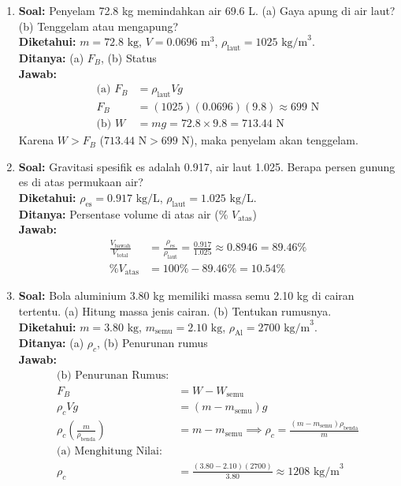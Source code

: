 \documentclass[twocolumn]{article}
\begin{document}
\begin{enumerate}
    \item \textbf{Soal:} Penyelam 72.8 kg memindahkan air 69.6 L. (a) Gaya apung di air laut? (b) Tenggelam atau mengapung? \\
    \textbf{Diketahui:} $m = 72.8 \text{ kg}$, $V = 0.0696 \text{ m}^3$, $\rho_{\text{laut}} = 1025 \text{ kg/m}^3$. \\
    \textbf{Ditanya:} (a) $F_B$, (b) Status \\
    \textbf{Jawab:}
    \begin{align*}
        \text{(a) } F_B &= \rho_{\text{laut}} V g \\
        F_B &= (1025)(0.0696)(9.8) \approx 699 \text{ N} \\
        \text{(b) } W &= mg = 72.8 \times 9.8 = 713.44 \text{ N}
    \end{align*}
    Karena $W > F_B$ ($713.44 \text{ N} > 699 \text{ N}$), maka penyelam akan tenggelam.

    \item \textbf{Soal:} Gravitasi spesifik es adalah 0.917, air laut 1.025. Berapa persen gunung es di atas permukaan air? \\
    \textbf{Diketahui:} $\rho_{\text{es}} = 0.917 \text{ kg/L}$, $\rho_{\text{laut}} = 1.025 \text{ kg/L}$. \\
    \textbf{Ditanya:} Persentase volume di atas air (\% $V_{\text{atas}}$) \\
    \textbf{Jawab:}
    \begin{align*}
        \frac{V_{\text{bawah}}}{V_{\text{total}}} &= \frac{\rho_{\text{es}}}{\rho_{\text{laut}}} = \frac{0.917}{1.025} \approx 0.8946 = 89.46\% \\
        \% V_{\text{atas}} &= 100\% - 89.46\% = 10.54\%
    \end{align*}

    \item \textbf{Soal:} Bola aluminium 3.80 kg memiliki massa semu 2.10 kg di cairan tertentu. (a) Hitung massa jenis cairan. (b) Tentukan rumusnya. \\
    \textbf{Diketahui:} $m = 3.80 \text{ kg}$, $m_{\text{semu}} = 2.10 \text{ kg}$, $\rho_{\text{Al}} = 2700 \text{ kg/m}^3$. \\
    \textbf{Ditanya:} (a) $\rho_c$, (b) Penurunan rumus \\
    \textbf{Jawab:}
    \begin{align*}
        \text{(b) Penurunan Rumus:} \\
        F_B &= W - W_{\text{semu}} \\
        \rho_c V g &= (m - m_{\text{semu}}) g \\
        \rho_c \left( \frac{m}{\rho_{\text{benda}}} \right) &= m - m_{\text{semu}} \implies \rho_c = \frac{(m - m_{\text{semu}}) \rho_{\text{benda}}}{m} \\
        \text{(a) Menghitung Nilai:} \\
        \rho_c &= \frac{(3.80 - 2.10)(2700)}{3.80} \approx 1208 \text{ kg/m}^3
    \end{align*}


\end{enumerate}
\end{document}

